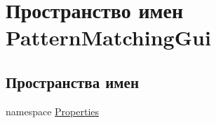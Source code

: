 \hypertarget{namespace_pattern_matching_gui}{
\section{Пространство имен PatternMatchingGui}
\label{namespace_pattern_matching_gui}
}
\subsection*{Пространства имен}
\begin{CompactItemize}
\item 
namespace \hyperlink{namespace_pattern_matching_gui_1_1_properties}{Properties}
\end{CompactItemize}
